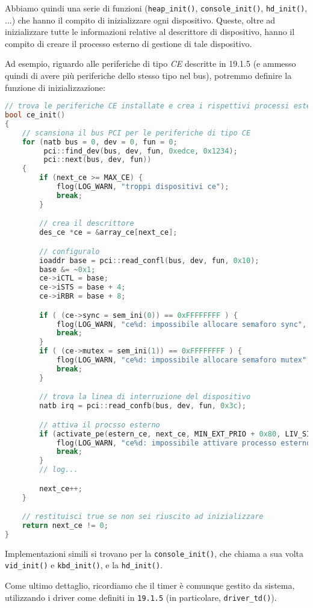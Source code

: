 \documentclass[a4paper,11pt]{article}
\begin{document}
Abbiamo quindi una serie di funzioni (\lstinline|heap_init()|, \lstinline|console_init()|, \lstinline|hd_init()|, ...) che hanno il compito di inizializzare ogni dispositivo.
Queste, oltre ad inizializzare tutte le informazioni relative al descrittore di dispositivo, hanno il compito di creare il processo esterno di gestione di tale dispositivo.

Ad esempio, riguardo alle periferiche di tipo \textit{CE} descritte in 19.1.5 (e ammesso quindi di avere più periferiche dello stesso tipo nel bus), potremmo definire la funzione di inizializzazione:
\begin{lstlisting}[language=C++, style=codestyle]	
// trova le periferiche CE installate e crea i rispettivi processi esterni
bool ce_init()
{
	// scansiona il bus PCI per le periferiche di tipo CE
	for (natb bus = 0, dev = 0, fun = 0;
	     pci::find_dev(bus, dev, fun, 0xedce, 0x1234);
	     pci::next(bus, dev, fun))
	{
		if (next_ce >= MAX_CE) {
			flog(LOG_WARN, "troppi dispositivi ce");
			break;
		}

		// crea il descrittore
		des_ce *ce = &array_ce[next_ce];

		// configuralo
		ioaddr base = pci::read_confl(bus, dev, fun, 0x10);
		base &= ~0x1;
		ce->iCTL = base;
		ce->iSTS = base + 4;
		ce->iRBR = base + 8;

		if ( (ce->sync = sem_ini(0)) == 0xFFFFFFFF ) {
			flog(LOG_WARN, "ce%d: impossibile allocare semaforo sync", next_ce);
			break;
		}
		if ( (ce->mutex = sem_ini(1)) == 0xFFFFFFFF ) {
			flog(LOG_WARN, "ce%d: impossibile allocare semaforo mutex", next_ce);
			break;
		}

		// trova la linea di interruzione del dispositivo
		natb irq = pci::read_confb(bus, dev, fun, 0x3c);

		// attiva il procsso esterno
		if (activate_pe(estern_ce, next_ce, MIN_EXT_PRIO + 0x80, LIV_SISTEMA, irq) == 0xFFFFFFFF) {
			flog(LOG_WARN, "ce%d: impossibile attivare processo esterno", next_ce);
			break;
		}
		// log...

		next_ce++;
	}

	// restituisci true se non sei riuscito ad inizializzare
	return next_ce != 0;
}
\end{lstlisting}

Implementazioni simili si trovano per la \lstinline|console_init()|, che chiama a sua volta \lstinline|vid_init()| e \lstinline|kbd_init()|, e la \lstinline|hd_init()|.

Come ultimo dettaglio, ricordiamo che il timer è comunque gestito da sistema, utilizzando i driver come definiti in \lstinline|19.1.5| (in particolare, \lstinline|driver_td()|). 
\end{document}
